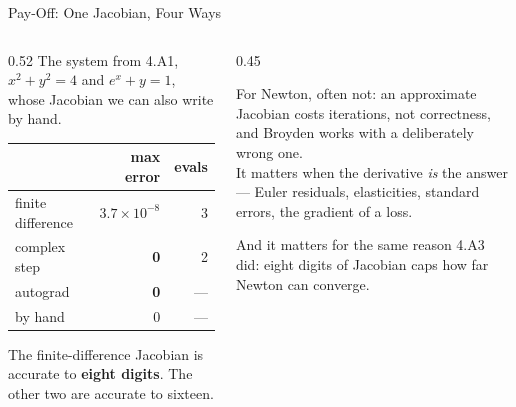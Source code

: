 \begin{frame}{Pay-Off: One Jacobian, Four Ways}
\begin{columns}[T]
\begin{column}{0.52\textwidth}
\small
The system from 4.A1, $x^{2}+y^{2}=4$ and $e^{x}+y=1$, whose Jacobian we can also write by hand.
\medskip
\begin{center}\footnotesize
\begin{tabularx}{\linewidth}{@{}>{\raggedright\arraybackslash}X r r@{}}
\toprule
 & \textbf{max error} & \textbf{evals} \\
\midrule
finite difference & $3.7\times10^{-8}$ & 3 \\
complex step & \textbf{0} & 2 \\
autograd & \textbf{0} & --- \\
by hand & 0 & --- \\
\bottomrule
\end{tabularx}
\end{center}
\medskip
\footnotesize
The finite-difference Jacobian is accurate to \textbf{eight digits}. The other two are accurate to sixteen.
\end{column}
\begin{column}{0.45\textwidth}
\begin{takeawaybox}[title=\textbf{Does it matter?}]\small
For Newton, often not: an approximate Jacobian costs iterations, not correctness, and Broyden works with a deliberately wrong one.\\[1mm]
It matters when the derivative \emph{is} the answer --- Euler residuals, elasticities, standard errors, the gradient of a loss.
\end{takeawaybox}
\medskip
\begin{examplebox}\footnotesize
And it matters for the same reason 4.A3 did: eight digits of Jacobian caps how far Newton can converge.
\end{examplebox}
\end{column}
\end{columns}
\end{frame}

